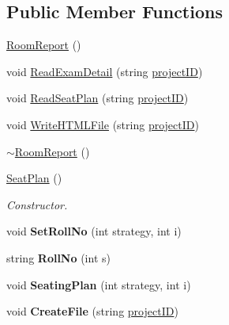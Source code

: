 \subsection*{\-Public \-Member \-Functions}
\begin{DoxyCompactItemize}
\item 
\hyperlink{classSeatPlan_a974a336df39c9fefc2b239a382a4749c}{\-Room\-Report} ()
\item 
void \hyperlink{classSeatPlan_ae93cefd4fd0401c5d54b8e97b23541ae}{\-Read\-Exam\-Detail} (string \hyperlink{classReadInput_a3ad470a25b3e0a29466bf4ff1f7d8e81}{project\-I\-D})
\item 
void \hyperlink{classSeatPlan_a618d148beefee9d4db3d038328c9b2c8}{\-Read\-Seat\-Plan} (string \hyperlink{classReadInput_a3ad470a25b3e0a29466bf4ff1f7d8e81}{project\-I\-D})
\item 
void \hyperlink{classSeatPlan_af572f79142f4dad362f54892c6747214}{\-Write\-H\-T\-M\-L\-File} (string \hyperlink{classReadInput_a3ad470a25b3e0a29466bf4ff1f7d8e81}{project\-I\-D})
\item 
\hyperlink{classSeatPlan_a446949506a25bcda5eb972c8a4b1384d}{$\sim$\-Room\-Report} ()
\item 
\hyperlink{classSeatPlan_ab1906186f96847704ed71f1a6c738327}{\-Seat\-Plan} ()
\begin{DoxyCompactList}\small\item\em \-Constructor. \end{DoxyCompactList}\item 
\hypertarget{classSeatPlan_afa418b9edadff831c73ea6005666becf}{void {\bfseries \-Set\-Roll\-No} (int strategy, int i)}\label{d2/d41/classSeatPlan_afa418b9edadff831c73ea6005666becf}

\item 
\hypertarget{classSeatPlan_a3dfc44c97eab7f3d33f2023ae0faaa13}{string {\bfseries \-Roll\-No} (int s)}\label{d2/d41/classSeatPlan_a3dfc44c97eab7f3d33f2023ae0faaa13}

\item 
\hypertarget{classSeatPlan_a1df3b03c983936c07225ed1a79959f1b}{void {\bfseries \-Seating\-Plan} (int strategy, int i)}\label{d2/d41/classSeatPlan_a1df3b03c983936c07225ed1a79959f1b}

\item 
\hypertarget{classSeatPlan_ade684c0f63b648d4d62df8e7ed800682}{void {\bfseries \-Create\-File} (string \hyperlink{classReadInput_a3ad470a25b3e0a29466bf4ff1f7d8e81}{project\-I\-D})}\label{d2/d41/classSeatPlan_ade684c0f63b648d4d62df8e7ed800682}


\end{DoxyCompactItemize}

